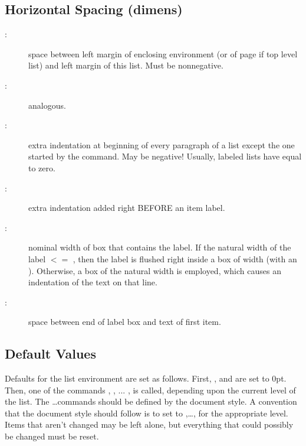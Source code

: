  \subsection{Horizontal Spacing (dimens)}
 \begin{description}
 \item[:] space between left margin of enclosing
   environment (or of page if top level list) and left margin of
                     this list.  Must be nonnegative.
  \item[:] analogous.
  \item[:] extra indentation at beginning of every
     paragraph of a list except the one started by the 
                      command.  May be negative!  Usually, labeled
                       lists have  equal to zero.
   \item[:] extra indentation added right BEFORE an item
                      label.
  \item[:] nominal width of box that contains the label.
                      If the natural width of the
                         label $< =$ ,
                      then the label is flushed right inside a box
                      of width  (with an ).
                      Otherwise,
                      a box of the natural width is employed, which
                       causes an indentation of the text on that line.
     \item[:] space between end of label box and text of
                      first item.
  \end{description}





 \subsection{Default Values}
      Defaults for the list environment are set as follows.
      First, ,  and 
      are set
      to 0pt.  Then, one of the commands
      , , ... , 
      is called, depending upon the current level of the list.
      The  \ldots commands should be defined by the document
      style.  A convention that the document style should follow is
      to set  to
      ,\ldots,  for
      the appropriate level.  Items that aren't changed may be left
      alone, but everything that could possibly be changed must be
      reset.


